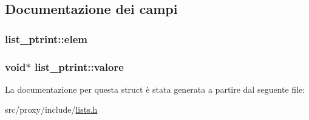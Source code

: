 \subsection{Documentazione dei campi}
\hypertarget{structlist__ptrint_a39c87bcd548089f52d94807b0e5771ac}{
\subsubsection[{elem}]{ {\bf list\_\-ptrint::elem}}}
\label{structlist__ptrint_a39c87bcd548089f52d94807b0e5771ac}
\hypertarget{structlist__ptrint_a5c56a717f43a7ef15972bfd77dc644b4}{
\subsubsection[{valore}]{\setlength{\rightskip}{0pt plus 5cm}void$\ast$ {\bf list\_\-ptrint::valore}}}
\label{structlist__ptrint_a5c56a717f43a7ef15972bfd77dc644b4}


La documentazione per questa struct è stata generata a partire dal seguente file:\begin{DoxyCompactItemize}
\item 
src/proxy/include/\hyperlink{lists_8h}{lists.h}\end{DoxyCompactItemize}
